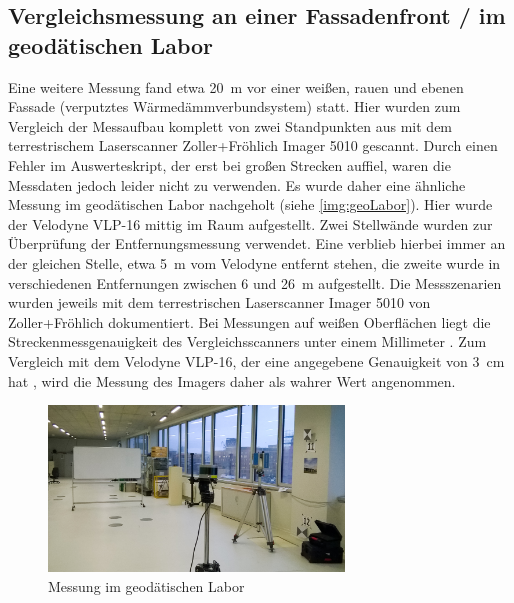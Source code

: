 \documentclass[a4paper,12pt,bibliography=totoc, listof=totoc,titlepage,pointlessnumbers]{scrreprt}
\begin{document}
\subsection{Vergleichsmessung an einer Fassadenfront / im geodätischen Labor}
Eine weitere Messung fand etwa 20~m vor einer weißen, rauen und ebenen Fassade (verputztes Wärmedämmverbundsystem) statt. Hier wurden zum Vergleich der Messaufbau komplett von zwei Standpunkten aus mit dem terrestrischem Laser\-scan\-ner Zoller+Fröhlich Imager 5010 gescannt. Durch einen Fehler im Auswerteskript, der erst bei großen Strecken auffiel, waren die Messdaten jedoch leider nicht zu verwenden. Es wurde daher eine ähnliche Messung im geodätischen Labor nachgeholt (siehe \autoref{img:geoLabor}).
Hier wurde der Velodyne VLP-16 mittig im Raum aufgestellt. Zwei Stellwände wurden zur Überprüfung der Entfernungsmessung verwendet. Eine verblieb hierbei immer an der gleichen Stelle, etwa 5~m vom Velodyne entfernt stehen, die zweite wurde in verschiedenen Entfernungen zwischen 6 und 26~m aufgestellt. Die Messszenarien wurden jeweils mit dem terrestrischen Laser\-scan\-ner Imager 5010 von Zoller+Fröhlich dokumentiert. Bei Messungen auf weißen Oberflächen liegt die Streckenmessgenauigkeit des Vergleichsscanners unter einem Millimeter \citep{imager5010}. Zum Vergleich mit dem Velodyne VLP-16, der eine angegebene Genauigkeit von 3~cm hat \citep{vlpSheet}, wird die Messung des Imagers daher als wahrer Wert angenommen.

\begin{figure}
 \centering
 \includegraphics[width=0.7\textwidth]{./img/geoLabor.jpg}
 \caption{Messung im geodätischen Labor}
 \label{img:geoLabor}
\end{figure}
\end{document}
